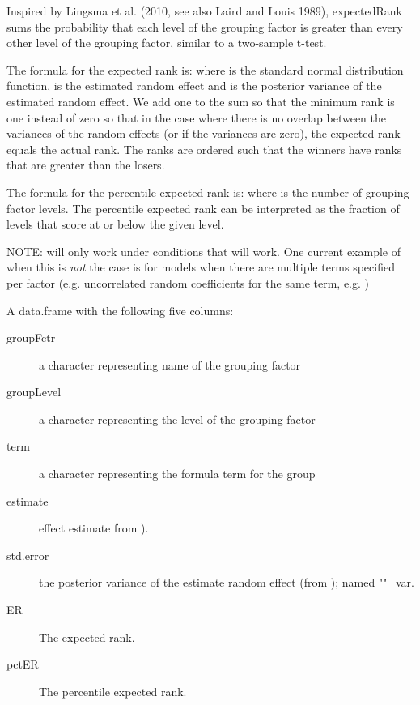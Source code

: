 \documentclass[letterpaper]{book}
\begin{document}
\begin{Details}\relax
Inspired by Lingsma et al. (2010, see also Laird and Louis 1989),
expectedRank sums the probability that each level of the grouping factor is
greater than every other level of the grouping factor, similar to a
two-sample t-test.

The formula for the expected rank is:
where \eqn{\phi}{} is the standard normal distribution function, \eqn{\theta}{}
is the estimated random effect and  is the posterior
variance of the estimated random effect. We add one to the sum so that the
minimum rank is one instead of zero so that in the case where there is no
overlap between the variances of the random effects (or if the variances are
zero), the expected rank equals the actual rank.  The ranks are ordered such
that the winners have ranks that are greater than the losers.

The formula for the percentile expected rank is:
where  is the number of grouping factor levels. The percentile
expected rank can be interpreted as the fraction of levels that score at or
below the given level.

NOTE:  will only work under conditions that 
will work. One current example of when this is \emph{not} the case is for
models when there are multiple terms specified per factor (e.g. uncorrelated random
coefficients for the same term, e.g.
)
\end{Details}
%
\begin{Value}
A data.frame with the following five columns:
\begin{description}

\item[groupFctr] a character representing name of the grouping factor
\item[groupLevel] a character representing the level of the grouping factor
\item[term] a character representing the formula term for the group
\item[estimate] effect estimate from ).
\item[std.error] the posterior variance of the estimate random effect
(from ); named ""\_var.
\item[ER] The expected rank.
\item[pctER] The percentile expected rank.

\end{description}

\end{Value}
\end{document}
